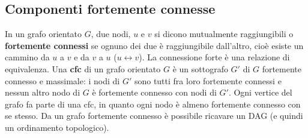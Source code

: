 \documentclass[11pt]{article}
\begin{document}
\subsection{Componenti fortemente connesse}
In un grafo orientato $G$, due nodi, $u$ e $v$ si dicono mutualmente raggiungibili o \textbf{fortemente connessi} se 
ognuno dei due è raggiungibile dall'altro, cioè esiste un cammino da $u$ a $v$ e da $v$ a $u$ ($u \leftrightarrow v$).
La connessione forte è una relazione di equivalenza.
Una \textbf{cfc} di un grafo orientato $G$ è un sottografo $G'$ di $G$ fortemente connesso e massimale: i nodi di $G'$ sono 
tutti fra loro fortemente connessi e nessun altro nodo di $G$ è fortemente connesso con nodi di $G'$. Ogni vertice del grafo 
fa parte di una cfc, in quanto ogni nodo è almeno fortemente connesso con se stesso. Da un grafo fortemente connesso è possibile 
ricavare un DAG (e quindi un ordinamento topologico). 
\end{document}
